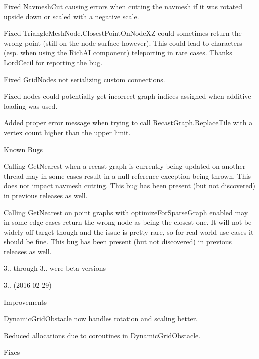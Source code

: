 \begin{DoxyItemize}
\begin{DoxyItemize}
\begin{DoxyItemize}
\item Fixed Navmesh\+Cut causing errors when cutting the navmesh if it was rotated upside down or scaled with a negative scale.
\item Fixed Triangle\+Mesh\+Node.\+Closest\+Point\+On\+Node\+XZ could sometimes return the wrong point (still on the node surface however). This could lead to characters (esp. when using the Rich\+AI component) teleporting in rare cases. Thanks Lord\+Cecil for reporting the bug.
\item Fixed Grid\+Nodes not serializing custom connections.
\item Fixed nodes could potentially get incorrect graph indices assigned when additive loading was used.
\item Added proper error message when trying to call Recast\+Graph.\+Replace\+Tile with a vertex count higher than the upper limit.
\end{DoxyItemize}
\item Known Bugs
\begin{DoxyItemize}
\item Calling Get\+Nearest when a recast graph is currently being updated on another thread may in some cases result in a null reference exception being thrown. This does not impact navmesh cutting. This bug has been present (but not discovered) in previous releases as well.
\item Calling Get\+Nearest on point graphs with \textquotesingle{}optimize\+For\+Sparse\+Graph\textquotesingle{} enabled may in some edge cases return the wrong node as being the closest one. It will not be widely off target though and the issue is pretty rare, so for real world use cases it should be fine. This bug has been present (but not discovered) in previous releases as well.
\end{DoxyItemize}
\end{DoxyItemize}
\item 3.. through 3.. were beta versions
\item 3.. (2016-\/02-\/29)
\begin{DoxyItemize}
\item Improvements
\begin{DoxyItemize}
\item Dynamic\+Grid\+Obstacle now handles rotation and scaling better.
\item Reduced allocations due to coroutines in Dynamic\+Grid\+Obstacle.
\end{DoxyItemize}
\item Fixes

\end{DoxyItemize}
\end{DoxyItemize}
